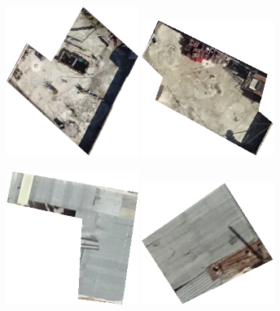 \documentclass[11pt]{article}
\begin{document}
	\begin{figure}
	
	\centering
	\begin{subfigure}[c]{0.32\textwidth}
		\includegraphics[width=0.47\textwidth]{figures/mat_examples/conc1.png}		
		\includegraphics[width=0.47\textwidth]{figures/mat_examples/conc2.png}
	\end{subfigure}
	\begin{subfigure}[c]{0.32\textwidth}
		\includegraphics[width=0.47\textwidth]{figures/mat_examples/hm1.png}		
		\includegraphics[width=0.47\textwidth]{figures/mat_examples/hm2.png}

\end{subfigure}
\end{figure}
\end{document}
